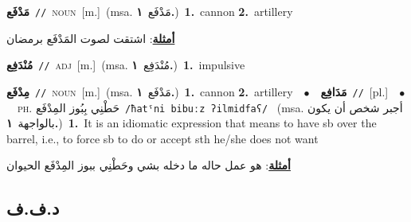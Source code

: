 \documentclass[10pt,a4paper,twoside]{article} %
\begin{document}
\begin{multicols}{2}
{\setlength\topsep{0pt}\textbf{\foreignlanguage{arabic}{مَدْفَع}}\ {\color{gray}\texttt{//}\color{black}}\ \textsc{noun}\ [m.]\ \color{gray}(msa. \foreignlanguage{arabic}{مَدْفَع}~\foreignlanguage{arabic}{\textbf{١.}})\color{black}\ \textbf{1.}~cannon  \textbf{2.}~artillery\  \begin{flushright}\color{gray}\foreignlanguage{arabic}{\textbf{\underline{\foreignlanguage{arabic}{أمثلة}}}: اشتقت لصوت المَدْفَع برمضان}\end{flushright}\color{black}} \vspace{2mm}

{\setlength\topsep{0pt}\textbf{\foreignlanguage{arabic}{مُنْدَفِع}}\ {\color{gray}\texttt{//}\color{black}}\ \textsc{adj}\ [m.]\ \color{gray}(msa. \foreignlanguage{arabic}{مُنْدَفِع}~\foreignlanguage{arabic}{\textbf{١.}})\color{black}\ \textbf{1.}~impulsive\ } \vspace{2mm}

{\setlength\topsep{0pt}\textbf{\foreignlanguage{arabic}{مِدْفَع}}\ {\color{gray}\texttt{//}\color{black}}\ \textsc{noun}\ [m.]\ \color{gray}(msa. \foreignlanguage{arabic}{مَدْفَع}~\foreignlanguage{arabic}{\textbf{١.}})\color{black}\ \textbf{1.}~cannon  \textbf{2.}~artillery\ \ $\bullet$\ \ \setlength\topsep{0pt}\textbf{\foreignlanguage{arabic}{مَدَافِع}}\ {\color{gray}\texttt{//}\color{black}}\ [pl.]\ \ $\bullet$\ \ \textsc{ph.} \color{gray} \foreignlanguage{arabic}{حَطْنِي بِبُوز المِدْفَع}\color{black}\ {\color{gray}\texttt{/{\sffamily ħatˤni bibuːz ʔilmidfaʕ}/}\color{black}}\ \color{gray} (msa. \foreignlanguage{arabic}{أجبر شخص أن يكون بالواجهة}~\foreignlanguage{arabic}{\textbf{١.}})\color{black}\ \textbf{1.}~It is an idiomatic expression that means to have sb over the barrel, i.e., to force sb to do or accept sth he/she does not want\  \begin{flushright}\color{gray}\foreignlanguage{arabic}{\textbf{\underline{\foreignlanguage{arabic}{أمثلة}}}: هو عمل حاله ما دخله بشي وحَطْنِي ببوز المِدْفَع الحيوان}\end{flushright}\color{black}} \vspace{2mm}

\vspace{-3mm}
\subsection*{\color{blue}\foreignlanguage{arabic}{د.ف.ف}\color{blue}{}} 


\end{multicols}
\end{document}
